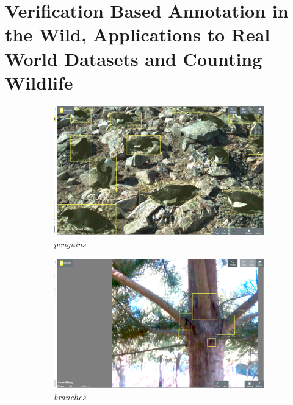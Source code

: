 \chapter{Verification Based Annotation in the Wild, Applications to Real World Datasets and Counting Wildlife}
\label{chap:annotation} 

\begin{figure}[htbp]
\centering
\begin{subfigure}[t]{0.24\linewidth}
  \includegraphics[width=1.0\linewidth]{figures/annotation/screenshots/penguins2.png}
   \caption{\emph{penguins}}
\end{subfigure}%
\begin{subfigure}[t]{0.24\linewidth}
  \includegraphics[width=1.0\linewidth]{figures/annotation/screenshots/branches3.png}
   \caption{\emph{branches}}
\end{subfigure}%
\begin{subfigure}[t]{0.24\linewidth}

\end{subfigure}
\end{figure}

